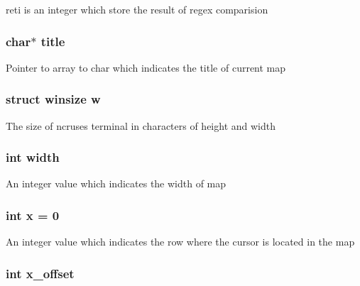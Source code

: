 reti is an integer which store the result of regex comparision \hypertarget{pacman-level-editor_8c_af06d911bb9e05f491ef3da520d03796c}{
\subsubsection[{title}]{\setlength{\rightskip}{0pt plus 5cm}char$\ast$ title}}\label{pacman-level-editor_8c_af06d911bb9e05f491ef3da520d03796c}
Pointer to array to char which indicates the title of current map \hypertarget{pacman-level-editor_8c_a114d2a5a196322c42d4cd57cccb1f43b}{
\subsubsection[{w}]{\setlength{\rightskip}{0pt plus 5cm}struct winsize w}}\label{pacman-level-editor_8c_a114d2a5a196322c42d4cd57cccb1f43b}
The size of ncruses terminal in characters of height and width \hypertarget{pacman-level-editor_8c_a2474a5474cbff19523a51eb1de01cda4}{
\subsubsection[{width}]{\setlength{\rightskip}{0pt plus 5cm}int width}}\label{pacman-level-editor_8c_a2474a5474cbff19523a51eb1de01cda4}
An integer value which indicates the width of map \hypertarget{pacman-level-editor_8c_a6150e0515f7202e2fb518f7206ed97dc}{
\subsubsection[{x}]{\setlength{\rightskip}{0pt plus 5cm}int x = 0}}\label{pacman-level-editor_8c_a6150e0515f7202e2fb518f7206ed97dc}
An integer value which indicates the row where the cursor is located in the map \hypertarget{pacman-level-editor_8c_a87147769c08c4f0fef7b0ec6077b338d}{
\subsubsection[{x\-\_\-offset}]{\setlength{\rightskip}{0pt plus 5cm}int x\-\_\-offset}}\label{pacman-level-editor_8c_a87147769c08c4f0fef7b0ec6077b338d}
